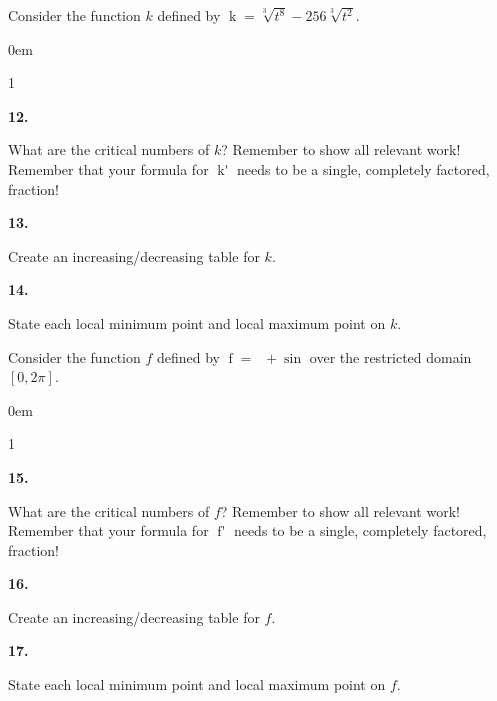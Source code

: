 \documentclass[12pt,]{book}
\theoremstyle{plain}
\theoremstyle{definition}
\numberwithin{equation}{section}
\newenvironment{exercisegroup}%
{\medskip\noindent}%
{\par\bigskip}%
\newlength{\exercisegroupindent}%
\newlength{\exercisegroupitemwidth}%
\newenvironment{exercisegrouplist}%
{\vspace{-\partopsep}%
\begin{adjustwidth}{\exercisegroupindent}{0em}}%
{\end{adjustwidth}%
\vspace{-\partopsep}%
\vspace{\baselineskip}}%
\newenvironment{exercisegroupbycol}[1]%
{\begin{exercisegrouplist}%
\vspace{-\multicolsep}%
\begin{multicols}{#1}%
\setlength{\parindent}{0em}%
\setlength{\exercisegroupitemwidth}{\linewidth}}%
{\end{multicols}%
\vspace{-\multicolsep}%
\end{exercisegrouplist}}%
\newenvironment{exercisegroupitem}[1]%
{\begin{minipage}[t]{\exercisegroupitemwidth}
\vspace{0pt}%
{\bfseries#1}%
\rule{0pt}{\baselineskip}}{\strut%
\end{minipage}%
\hspace{\columnsep}}%
\providecommand\phantomsection{}
\newcommand{\fe}[2]{\mathop{{#1}{\left(#2\right)}}}
\newcommand{\cinterval}[2]{\left[#1,#2\right]}
\newcommand{\fd}[1]{#1'}
\begin{document}
\begin{exercisegroup}%
Consider the function \(k\) defined by \(\fe{k}{t}=\sqrt[3]{t^8}-256\sqrt[3]{t^2}\).%
\par
\begin{exercisegroupbycol}{1}%
\begin{exercisegroupitem}{12. }\phantomsection\hypertarget{exercise-81}{\null}
What are the critical numbers of \(k\)?  Remember to show all relevant work!  Remember that your formula for \(\fe{\fd{k}}{t}\) needs to be a single, completely factored, fraction!%
\end{exercisegroupitem}%
\par%
\begin{exercisegroupitem}{13. }\phantomsection\hypertarget{exercise-82}{\null}
Create an increasing/decreasing table for \(k\).%
\end{exercisegroupitem}%
\par%
\begin{exercisegroupitem}{14. }\phantomsection\hypertarget{exercise-83}{\null}
State each local minimum point and local maximum point on \(k\).%
\end{exercisegroupitem}%
\par%
\end{exercisegroupbycol}%
\end{exercisegroup}%
\begin{exercisegroup}%
Consider the function \(f\) defined by \(\fe{f}{x}=\fe{\cos^2}{x}+\fe{\sin}{x}\) over the restricted domain \(\cinterval{0}{2\pi}\).%
\par
\begin{exercisegroupbycol}{1}%
\begin{exercisegroupitem}{15. }\phantomsection\hypertarget{exercise-84}{\null}
What are the critical numbers of \(f\)?  Remember to show all relevant work!  Remember that your formula for \(\fe{\fd{f}}{t}\) needs to be a single, completely factored, fraction!%
\end{exercisegroupitem}%
\par%
\begin{exercisegroupitem}{16. }\phantomsection\hypertarget{exercise-85}{\null}
Create an increasing/decreasing table for \(f\).%
\end{exercisegroupitem}%
\par%
\begin{exercisegroupitem}{17. }\phantomsection\hypertarget{exercise-86}{\null}
State each local minimum point and local maximum point on \(f\).%
\end{exercisegroupitem}%
\par%
\end{exercisegroupbycol}%
\end{exercisegroup}%
\end{document}
